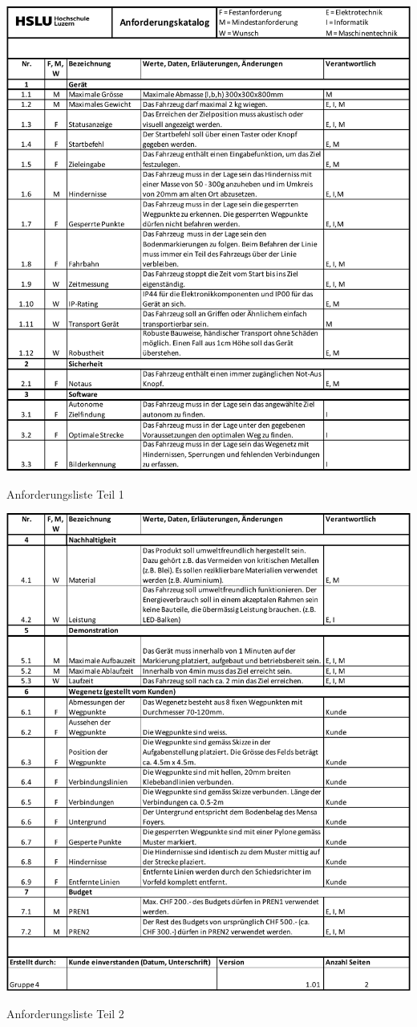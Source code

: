 \begin{table}[H]
\centering
\includegraphics[width=\textwidth]{assets/projektmanagement/Anforderungsliste_V1.01_page1.pdf}
\caption{Anforderungsliste Teil 1}
\label{table:anforderungsliste_page1}
\end{table}
\newpage

\begin{table}[H]
\centering
\includegraphics[width=\textwidth]{assets/projektmanagement/Anforderungsliste_V1.01_page2.pdf}
\caption{Anforderungsliste Teil 2}
\label{table:anforderungsliste_page2}
\end{table}
\newpage
